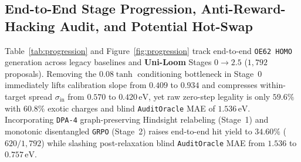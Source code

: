 \documentclass[11pt,a4paper]{article}
\begin{document}
\begin{table}[!t]
\centering
\caption{Single-\texttt{NVIDIA A800-80GB} generation and training throughput scaling (\texttt{speed\_benchmark.json}, $256$ molecules per sampling arm).}
\label{tab:speed}
\end{table}

\subsection{End-to-End Stage Progression, Anti-Reward-Hacking Audit, and Potential Hot-Swap}
\label{sec:exp_progression}

Table~\ref{tab:progression} and Figure~\ref{fig:progression} track end-to-end \texttt{OE62 HOMO} generation across legacy baselines and \textbf{Uni-Loom} Stages $0 \to 2.5$ ($1{,}792$ proposals). Removing the $0.08\tanh$ conditioning bottleneck in Stage~0 immediately lifts calibration slope from $0.409$ to $0.934$ and compresses within-target spread $\sigma_{\text{in}}$ from $0.570$ to $0.420\,\text{eV}$, yet raw zero-step legality is only $59.6\%$ with $60.8\%$ exotic charges and blind \texttt{AuditOracle} MAE of $1.536\,\text{eV}$. Incorporating \texttt{DPA-4} graph-preserving Hindsight relabeling (Stage~1) and monotonic disentangled \texttt{GRPO} (Stage~2) raises end-to-end hit yield to $34.60\%$ ($620/1{,}792$) while slashing post-relaxation blind \texttt{AuditOracle} MAE from $1.536$ to $0.757\,\text{eV}$.
\end{document}
